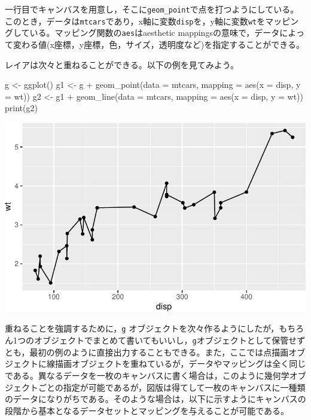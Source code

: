 \documentclass[
  a4paper,
]{ltjsbook}
\newenvironment{Shaded}{\begin{snugshade}}{\end{snugshade}}
\newcommand{\AttributeTok}[1]{\textcolor[rgb]{0.40,0.45,0.13}{#1}}
\newcommand{\FunctionTok}[1]{\textcolor[rgb]{0.28,0.35,0.67}{#1}}
\newcommand{\NormalTok}[1]{\textcolor[rgb]{0.00,0.23,0.31}{#1}}
\newcommand{\OtherTok}[1]{\textcolor[rgb]{0.00,0.23,0.31}{#1}}
\newcommand{\SpecialCharTok}[1]{\textcolor[rgb]{0.37,0.37,0.37}{#1}}
\begin{document}
一行目でキャンバスを用意し，そこに\texttt{geom\_point}で点を打つようにしている。
このとき，データは\texttt{mtcars}であり，x軸に変数\texttt{disp}を，y軸に変数\texttt{wt}をマッピングしている。マッピング関数の\texttt{aes}はaesthetic
mappingsの意味で，データによって変わる値(x座標，y座標，色，サイズ，透明度など)を指定することができる。

レイアは次々と重ねることができる。以下の例を見てみよう。

\begin{Shaded}
\begin{Highlighting}[]
\NormalTok{g }\OtherTok{\textless{}{-}} \FunctionTok{ggplot}\NormalTok{()}
\NormalTok{g1 }\OtherTok{\textless{}{-}}\NormalTok{ g }\SpecialCharTok{+} \FunctionTok{geom\_point}\NormalTok{(}\AttributeTok{data =}\NormalTok{ mtcars, }\AttributeTok{mapping =} \FunctionTok{aes}\NormalTok{(}\AttributeTok{x =}\NormalTok{ disp, }\AttributeTok{y =}\NormalTok{ wt))}
\NormalTok{g2 }\OtherTok{\textless{}{-}}\NormalTok{ g1 }\SpecialCharTok{+} \FunctionTok{geom\_line}\NormalTok{(}\AttributeTok{data =}\NormalTok{ mtcars, }\AttributeTok{mapping =} \FunctionTok{aes}\NormalTok{(}\AttributeTok{x =}\NormalTok{ disp, }\AttributeTok{y =}\NormalTok{ wt))}
\FunctionTok{print}\NormalTok{(g2)}
\end{Highlighting}
\end{Shaded}

\includegraphics{chapter04_files/figure-pdf/geom_overlay-1.pdf}

重ねることを強調するために，\texttt{g}
オブジェクトを次々作るようにしたが，もちろん1つのオブジェクトでまとめて書いてもいいし，\texttt{g}オブジェクトとして保管せずとも，最初の例のように直接出力することもできる。また，ここでは点描画オブジェクトに線描画オブジェクトを重ねているが，データやマッピングは全く同じである。異なるデータを一枚のキャンバスに書く場合は，このように幾何学オブジェクトごとの指定が可能であるが，図版は得てして一枚のキャンバスに一種類のデータになりがちである。そのような場合は，以下に示すようにキャンバスの段階から基本となるデータセットとマッピングを与えることが可能である。
\end{document}
